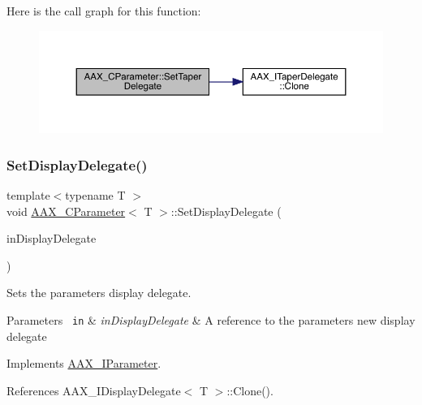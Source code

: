 Here is the call graph for this function\+:
\nopagebreak
\begin{figure}[H]
\begin{center}
\leavevmode
\includegraphics[width=350pt]{a01537_a73951bf97667382f01103a9230ce0c3e_cgraph}
\end{center}
\end{figure}
\mbox{\label{a01537_a75619ec0a487c28966dc5448e4d2ab05}} 
\subsubsection{\texorpdfstring{SetDisplayDelegate()}{SetDisplayDelegate()}}
{\footnotesize\ttfamily template$<$typename T $>$ \\
void \mbox{\hyperlink{a01537}{A\+A\+X\+\_\+\+C\+Parameter}}$<$ T $>$\+::Set\+Display\+Delegate (\begin{DoxyParamCaption}\item[{\mbox{\hyperlink{a01797}{A\+A\+X\+\_\+\+I\+Display\+Delegate\+Base}} \&}]{in\+Display\+Delegate }\end{DoxyParamCaption})\hspace{0.3cm}{\ttfamily [virtual]}}



Sets the parameter\textquotesingle{}s display delegate. 


\begin{DoxyParams}[1]{Parameters}
\mbox{\texttt{ in}}  & {\em in\+Display\+Delegate} & A reference to the parameter\textquotesingle{}s new display delegate \\
\hline
\end{DoxyParams}


Implements \mbox{\hyperlink{a01857_a16a75d76f077051eb6f852cde28f5152}{A\+A\+X\+\_\+\+I\+Parameter}}.



References A\+A\+X\+\_\+\+I\+Display\+Delegate$<$ T $>$\+::\+Clone().

